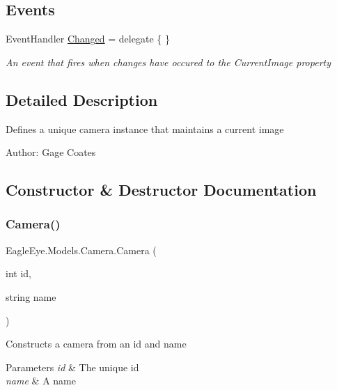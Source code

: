 \subsection*{Events}
\begin{DoxyCompactItemize}
\item 
Event\+Handler \mbox{\hyperlink{class_eagle_eye_1_1_models_1_1_camera_a4a8b47c765bd44f8ca6a89e59d3d3b94}{Changed}} = delegate \{ \}
\begin{DoxyCompactList}\small\item\em An event that fires when changes have occured to the Current\+Image property \end{DoxyCompactList}\end{DoxyCompactItemize}


\subsection{Detailed Description}
Defines a unique camera instance that maintains a current image 

Author\+: Gage Coates

\subsection{Constructor \& Destructor Documentation}
\mbox{\label{class_eagle_eye_1_1_models_1_1_camera_adcf152a7ad61686c8dd0a5ac919405b1}} 
\subsubsection{\texorpdfstring{Camera()}{Camera()}}
{\footnotesize\ttfamily Eagle\+Eye.\+Models.\+Camera.\+Camera (\begin{DoxyParamCaption}\item[{int}]{id,  }\item[{string}]{name }\end{DoxyParamCaption})}



Constructs a camera from an id and name 


\begin{DoxyParams}{Parameters}
{\em id} & The unique id\\
\hline
{\em name} & A name\\
\hline
\end{DoxyParams}


